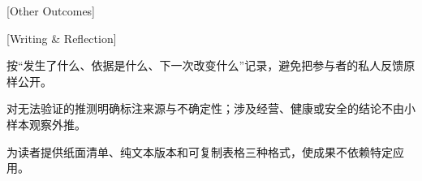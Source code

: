 [Other Outcomes]

\begin{resumegrid}[3]
\end{resumegrid}

[Writing \& Reflection]

\begin{resumelist}
  \item 按“发生了什么、依据是什么、下一次改变什么”记录，避免把参与者的私人反馈原样公开。
  \item 对无法验证的推测明确标注来源与不确定性；涉及经营、健康或安全的结论不由小样本观察外推。
  \item 为读者提供纸面清单、纯文本版本和可复制表格三种格式，使成果不依赖特定应用。
\end{resumelist}
